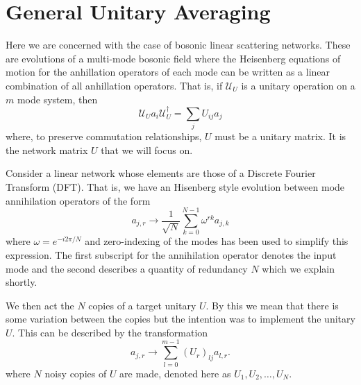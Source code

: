\documentclass[aps,pra,twocolumn,superscriptaddress,numerical,floatfix]{revtex4-1}
\begin{document}
\section{General Unitary Averaging\label{gen case}}

Here we are concerned with the case of bosonic linear scattering networks.  These are evolutions of a multi-mode bosonic field where the Heisenberg equations of motion for the anhillation operators of each mode can be written as a linear combination of all anhillation operators.  That is, if $\mathcal{U}_U$ is a unitary operation on a $m$ mode system, then
\begin{equation}
	\mathcal{U}_U a_i \mathcal{U}_U^\dagger = \sum_j U_{ij} a_j
\end{equation}
where, to preserve commutation relationships, $U$ must be a unitary matrix.  It is the network matrix $U$ that we will focus on.

Consider a linear network whose elements are those of a Discrete Fourier Transform (DFT).  That is, we have an Hisenberg style evolution between mode annihilation operators of the form
\begin{equation}
	a_{j,r} \rightarrow \frac{1}{\sqrt{N}} \sum_{k=0}^{N-1} \omega^{rk} a_{j,k}	
\end{equation}
where $\omega = e^{-i2\pi /N}$ and zero-indexing of the modes has been used to simplify this expression.  The first subscript for the annihilation operator denotes the input mode and the second describes a quantity of redundancy $N$ which we explain shortly. 

We then act the $N$ copies of a target unitary $U$.  By this we mean that there is some variation between the copies but the intention was to implement the unitary $U$.  This can be described by the transformation
\begin{equation}
	a_{j,r} \rightarrow \sum_{l=0}^{m-1} (U_r)_{lj} a_{l,r}.
\end{equation}
where $N$ noisy copies of $U$ are made, denoted here as $U_1, U_2, \ldots, U_N$. 
\end{document}
